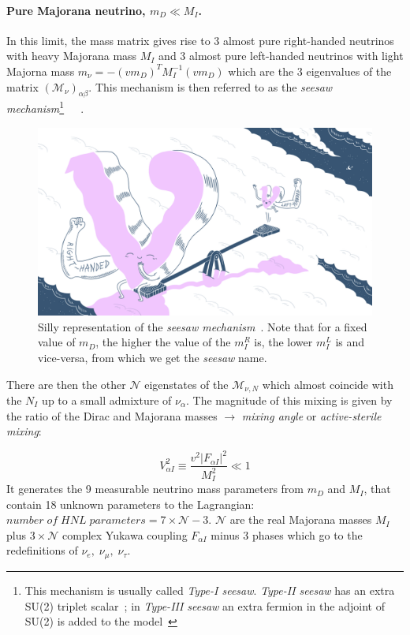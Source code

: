 \paragraph {Pure Majorana neutrino, $m_D \ll M_I$.}
In this limit, the mass matrix gives rise to 3 almost pure right-handed neutrinos with heavy Majorana mass $M_I$ and 3 almost pure left-handed neutrinos with light Majorna mass $m_\nu = - (vm_D)^{T}M^{-1}_{I}(vm_D)$ which are the 3 eigenvalues of the matrix $(\mathcal{M}_{\nu})_{\alpha \beta}$. This mechanism is then referred to as the \emph{seesaw mechanism}\footnote{This mechanism is usually called \emph{Type-I seesaw}. \emph{Type-II seesaw} has an extra SU(2) triplet scalar~\cite{Deppisch_2015}; in \emph{Type-III seesaw} an extra fermion in the adjoint of SU(2) is added to the model~\cite{Foot:1988aq}}~\cite{MINKOWSKI1977421}~\cite{Mohapatra:1979ia}~\cite{Yanagida:1979as}.
\begin{figure}[h]
  \centering
  \includegraphics[width=.60\textwidth]{Figures/c3/funny.png}
    \caption{Silly representation of the \emph{seesaw mechanism}~\cite{funny}. Note that for a fixed value of $m_D$, the higher the value of the $m^{R}_I$ is, the lower $m^{L}_I$ is and vice-versa, from which we get the \emph{seesaw} name.}
  \label{fig:c3funny}
\end{figure}
There are then the other $\mathcal{N}$ eigenstates of the $\mathcal{M}_{\nu,N}$ which almost coincide with the $N_I$ up to a small admixture of $\nu_\alpha$.
The magnitude of this mixing is given by the ratio of the Dirac and Majorana masses $\rightarrow$ \emph{mixing angle} or \emph{active-sterile mixing}:

\begin{equation}
\label{eq:v2}
 V^2_{\alpha I} \equiv \frac{v^{2}|F_{\alpha I}|^2}{M^{2}_{I}} \ll 1
\end{equation}
It generates the 9 measurable neutrino mass parameters from $m_D$ and $M_I$, that contain 18 unknown parameters to the Lagrangian: $number\; of \; HNL \; parameters = 7 \times \mathcal{N} - 3$. $\mathcal{N}$ are the real Majorana masses $M_I$ plus $3\times \mathcal{N}$ complex Yukawa coupling $F_{\alpha I}$ minus 3 phases which go to the redefinitions of $\nu_e, \; \nu_\mu,\; \nu_\tau$.

